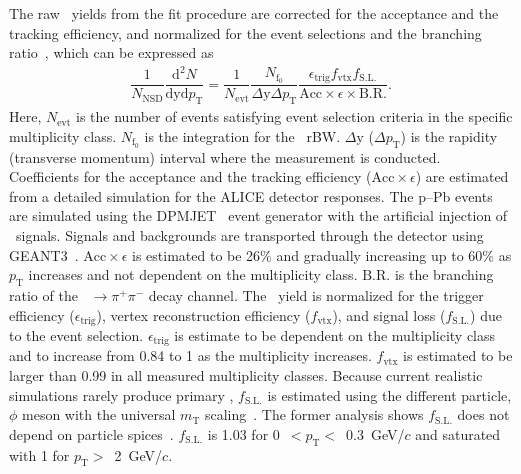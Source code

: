 The raw \fzero~yields from the fit procedure are corrected for the acceptance and the tracking efficiency, and normalized for the event selections and the branching ratio~\cite{ALICE:2022qnb}, which can be expressed as
\begin{eqnarray}
\dfrac{1}{N_{\mathrm{NSD}}}\dfrac{\mathrm{d}^{2}N}{\mathrm{dyd}p_{\mathrm{T}}} = \dfrac{1}{N_{\mathrm{evt}}} \dfrac{ N_{\mathrm{f}_{0}} }{ \Delta \mathrm{y} \Delta p_{\mathrm{T}} } \dfrac{  \epsilon_{\mathrm{trig}} f_{\mathrm{vtx}} f_{\mathrm{S.L.}} }{\mathrm{Acc} \times \epsilon \times \mathrm{B.R.} }.
\end{eqnarray}
Here, $N_{\mathrm{evt}}$ is the number of events satisfying event selection criteria in the specific multiplicity class. $N_{\mathrm{f}_{0}}$ is the integration for the \fzero~rBW. $\Delta \mathrm{y}$ ($\Delta p_{\mathrm{T}}$) is the rapidity (transverse momentum) interval where the measurement is conducted. Coefficients for the acceptance and the tracking efficiency ($\mathrm{Acc}\times\epsilon$) are estimated from a detailed simulation for the ALICE detector responses. The p--Pb events are simulated using the DPMJET~\cite{Fedynitch:2015kcn} event generator with the artificial injection of \fzero~signals. Signals and backgrounds are transported through the detector using GEANT3~\cite{Brun:1994aa}. $\mathrm{Acc}\times\epsilon$ is estimated to be 26\% and gradually increasing up to 60\% as $p_{\mathrm{T}}$ increases and not dependent on the multiplicity class. $\mathrm{B.R.}$ is the branching ratio of the \fzero~$\rightarrow \pi^{+}\pi^{-}$ decay channel. The \fzero~yield is normalized for the trigger efficiency ($\epsilon_{\mathrm{trig}}$), vertex reconstruction efficiency ($f_{\mathrm{vtx}}$), and signal loss ($f_{\mathrm{S.L.}}$) due to the event selection. $\epsilon_{\mathrm{trig}}$ is estimate to be dependent on the multiplicity class and to increase from 0.84 to 1 as the multiplicity increases. $f_{\mathrm{vtx}}$ is estimated to be larger than 0.99 in all measured multiplicity classes. Because current realistic  simulations rarely produce primary \fzero, $f_{\mathrm{S.L.}}$ is estimated using the different particle, $\phi$ meson with the universal $m_{\mathrm{T}}$ scaling~\cite{Altenkamper:2017qot}. The former analysis shows $f_{\mathrm{S.L.}}$ does not depend on particle spices~\cite{ALICE:2019xyr}. $f_{\mathrm{S.L.}}$ is 1.03 for 0~$<p_{\mathrm{T}}<$~0.3~GeV/$c$ and saturated with 1 for $p_{\mathrm{T}}>$~2~GeV/$c$.

